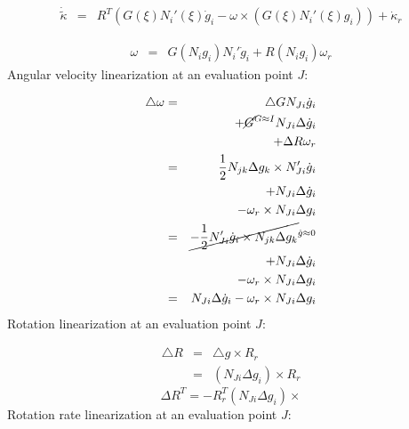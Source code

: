 \begin{eqnarray*}
\dot{\tilde{\kappa}} & = & R^{T}(G(\xi)N_{i}'(\xi)\dot{g}_{i}-\omega\times(G(\xi)N_{i}'(\xi)g_{i}))+\dot{\kappa}_{r}
\end{eqnarray*}

\begin{eqnarray*}
\omega & = & G(N_{i}g_{i})N_{i}'\dot{g}_{i}+R(N_{i}g_{i})\omega_{r}
\end{eqnarray*}
Angular velocity linearization at an evaluation point $J$:

\begin{eqnarray*}
\triangle\omega & = & \triangle GN_{Ji}\dot{g}_{i}\\
 &  & +\cancel{G}^{G\approx I}N_{Ji}\Delta\dot{g}_{i}\\
 &  & +\Delta R\omega_{r}\\
 & = & \frac{1}{2}N_{jk}\Delta g_{k}\times N'_{Ji}\dot{g}_{i}\\
 &  & +N_{Ji}\Delta\dot{g}_{i}\\
 &  & -\omega_{r}\times N_{Ji}\Delta g_{i}\\
 & = & \cancel{-\frac{1}{2}N'_{Ji}\dot{g}_{i}\times N_{jk}\Delta g_{k}}^{\dot{g}\approx0}\\
 &  & +N_{Ji}\Delta\dot{g}_{i}\\
 &  & -\omega_{r}\times N_{Ji}\Delta g_{i}\\
 & = & N_{Ji}\Delta\dot{g}_{i}-\omega_{r}\times N_{Ji}\Delta g_{i}
\end{eqnarray*}
Rotation linearization at an evaluation point $J$:

\begin{eqnarray*}
\triangle R & = & \triangle g\times R_{r}\\
 & = & (N_{Ji}\Delta g_{i})\times R_{r}
\end{eqnarray*}
\[
\Delta R^{T}=-R_{r}^{T}(N_{Ji}\Delta g_{i})\times
\]
Rotation rate linearization at an evaluation point $J$:

